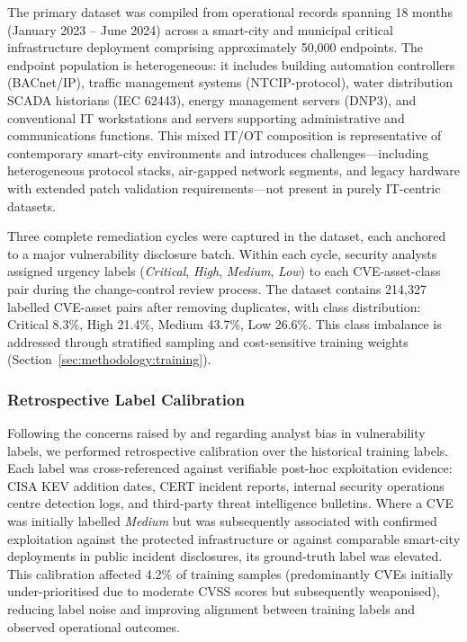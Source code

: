 \documentclass[review,12pt]{elsarticle}
\begin{document}
The primary dataset was compiled from operational records spanning 18 months (January 2023 -- June 2024) across a smart-city and municipal critical infrastructure deployment comprising approximately 50,000 endpoints. The endpoint population is heterogeneous: it includes building automation controllers (BACnet/IP), traffic management systems (NTCIP-protocol), water distribution SCADA historians (IEC 62443), energy management servers (DNP3), and conventional IT workstations and servers supporting administrative and communications functions. This mixed IT/OT composition is representative of contemporary smart-city environments and introduces challenges---including heterogeneous protocol stacks, air-gapped network segments, and legacy hardware with extended patch validation requirements---not present in purely IT-centric datasets.

Three complete remediation cycles were captured in the dataset, each anchored to a major vulnerability disclosure batch. Within each cycle, security analysts assigned urgency labels (\textit{Critical}, \textit{High}, \textit{Medium}, \textit{Low}) to each CVE-asset-class pair during the change-control review process. The dataset contains 214,327 labelled CVE-asset pairs after removing duplicates, with class distribution: Critical 8.3\%, High 21.4\%, Medium 43.7\%, Low 26.6\%. This class imbalance is addressed through stratified sampling and cost-sensitive training weights (Section~\ref{sec:methodology:training}).

\subsubsection{Retrospective Label Calibration}
\label{sec:methodology:calibration}

Following the concerns raised by \citet{sherif2026} and \citet{flood2024} regarding analyst bias in vulnerability labels, we performed retrospective calibration over the historical training labels. Each label was cross-referenced against verifiable post-hoc exploitation evidence: CISA KEV addition dates, CERT incident reports, internal security operations centre detection logs, and third-party threat intelligence bulletins. Where a CVE was initially labelled \textit{Medium} but was subsequently associated with confirmed exploitation against the protected infrastructure or against comparable smart-city deployments in public incident disclosures, its ground-truth label was elevated. This calibration affected 4.2\% of training samples (predominantly CVEs initially under-prioritised due to moderate CVSS scores but subsequently weaponised), reducing label noise and improving alignment between training labels and observed operational outcomes.
\end{document}
